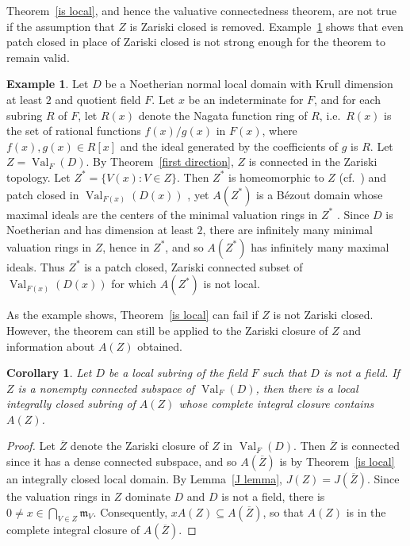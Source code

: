 \documentclass[preprint, 11pt,nonatbib]{elsarticle}
\DeclareMathOperator{\Dom}{Val}
\newtheorem{corollary}[theorem]{Corollary}
\theoremstyle{definition}
\newtheorem{example}[theorem]{Example}
\numberwithin{theorem}{section}
\begin{document}
 
 Theorem~\ref{is local}, and hence the valuative connectedness theorem,  are not true if the assumption that $Z$ is Zariski closed is removed.  Example~\ref{Nagata example} shows that even  patch closed in place of Zariski closed  is not strong enough for the theorem to remain valid. 


\begin{example} \label{Nagata example} Let $D$ be a Noetherian normal local domain with Krull dimension at least $2$ and quotient field $F$. Let $x$ be an indeterminate for $F$, and for each subring $R$ of $F$, let $R(x)$ denote the Nagata function ring of $R$, i.e.\ $R(x)$ is the set of rational functions $f(x)/g(x)$ in $F(x)$, where $f(x),g(x) \in R[x]$ and the ideal generated by the coefficients of $g$ is $R$. Let $Z = \Dom_F(D)$. By Theorem~\ref{first direction}, $Z$ is connected in the Zariski topology.  Let $Z^* = \{V(x):V \in Z\}$. Then $Z^*$ is homeomorphic to $Z$ (cf.~\cite[Proposition~4.2(b)]{MR3299704}) and patch closed in $\Dom_{F(x)}(D(x))$ \cite[Proposition~5.6(6)]{MR3299704}, yet $A(Z^*)$ is a B\'ezout  domain whose maximal ideals are the centers of the minimal valuation rings in $Z^*$ \cite[Corollary~5.8]{MR3299704}. 
Since $D$ is Noetherian and  has dimension at least $2$, there are infinitely many minimal valuation rings in $Z$, hence in $Z^*$, and so $A(Z^*)$ has infinitely many maximal ideals.  
Thus $Z^*$ is a patch closed, Zariski connected subset of $\Dom_{F(x)}(D(x))$ for which $A(Z^*)$ is not local. 
\end{example} 

As the example shows,  Theorem~\ref{is local} can fail if $Z$ is not Zariski closed. However,  the theorem can still be applied  
to the Zariski closure of $Z$ and information about $A(Z)$  obtained.  



 \begin{corollary} \label{is local corollary} Let $D$ be a local subring of the field $F$ such that $D$ is not a field. If $Z$ is a nonempty connected subspace of $\Dom_F(D)$, then
 there is a local integrally closed subring of $A(Z)$ whose complete integral closure contains $A(Z)$.  

 \end{corollary} 
 
 \begin{proof} 
 Let $\overline{Z}$ denote the Zariski closure of $Z$ in $\Dom_F(D)$.
 Then $\overline{Z}$ is connected since it has a dense connected subspace, and so $A(\overline{Z})$ is by Theorem~\ref{is local} an integrally closed local domain.
 By Lemma~\ref{J lemma}, $J(Z) = J(\overline{Z})$. 
 Since the valuation rings in $Z$ dominate $D$ and $D$ is not a field, there is $0 \ne x \in \bigcap_{V \in Z}{\mathfrak{m}}_V$. Consequently, $xA(Z) \subseteq A(\overline{Z})$, so that $A(Z)$ is in the complete integral closure of $A(\overline{Z})$. \end{proof}
 
\end{document}
